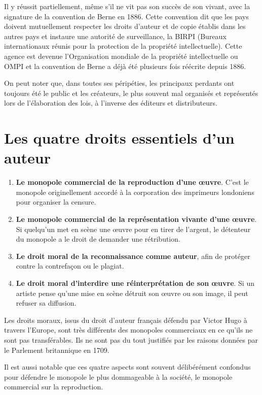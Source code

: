 Il y réussit partiellement, même s'il ne vit pas son succès de son vivant, avec la signature de la convention de Berne en 1886. Cette convention dit que les pays doivent mutuellement respecter les
droits d'auteur et de copie établis dans les autres pays et instaure une autorité de surveillance, la BIRPI (Bureaux internationaux réunis pour la protection de la propriété intellectuelle). Cette
agence est devenue l'Organisation mondiale de la propriété intellectuelle ou OMPI et la convention de Berne a déjà été
plusieurs
fois réécrite depuis 1886.

On peut noter que, dans toutes ses péripéties, les principaux perdants ont toujours été le public et les
créateurs, le plus souvent mal organisés et représentés lors de l'élaboration des lois, à
l'inverse des éditeurs et distributeurs.

\section{Les quatre droits essentiels d'un auteur}
\begin{enumerate}
\item 
\textbf{Le monopole commercial de la reproduction d'une œuvre}. C'est le monopole originellement accordé à la corporation des imprimeurs londoniens pour organiser la censure.
\item
\textbf{Le monopole commercial de la représentation vivante d'une œuvre}. Si quelqu'un met en scène une œuvre pour en tirer de l'argent, le détenteur du monopole a le droit de demander une
rétribution.
\item
\textbf{Le droit moral de la reconnaissance comme auteur}, afin de protéger contre la contrefaçon ou le plagiat.
\item
\textbf{Le droit moral d'interdire une réinterprétation de son œuvre}. Si un artiste pense qu'une mise en scène détruit son œuvre ou son image, il peut refuser sa diffusion.
\end{enumerate}

Les droits moraux, issus du droit d'auteur français défendu par Victor Hugo à travers l'Europe, sont très différents des monopoles commerciaux en ce qu'ils ne sont pas transférables. Ils ne sont pas
du tout justifiés par les raisons données par le Parlement britannique en 1709. 

Il est aussi notable que ces quatre aspects sont souvent délibérément confondus pour défendre le monopole le plus dommageable à la société, le monopole commercial sur la reproduction. 


